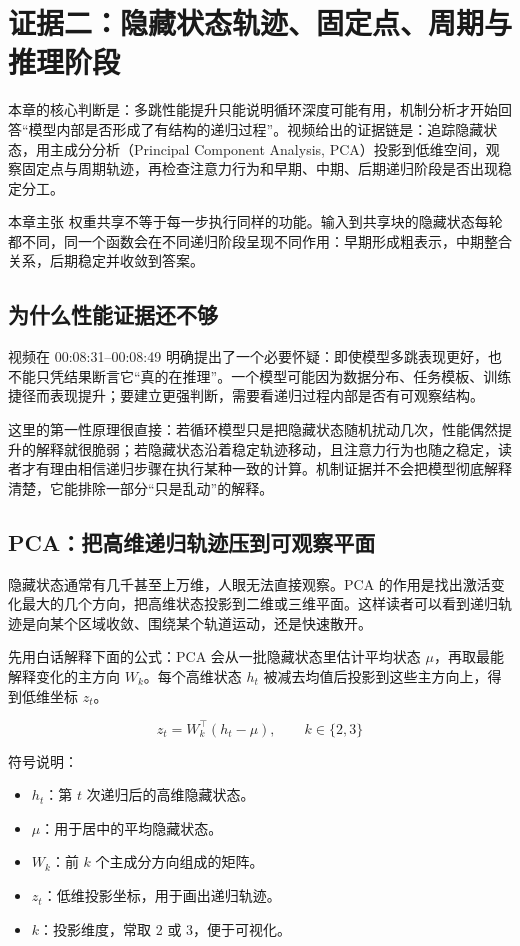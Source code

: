 \section{证据二：隐藏状态轨迹、固定点、周期与推理阶段}
\label{sec:mechanistic-analysis}

本章的核心判断是：多跳性能提升只能说明循环深度可能有用，机制分析才开始回答“模型内部是否形成了有结构的递归过程”。视频给出的证据链是：追踪隐藏状态，用主成分分析（Principal Component Analysis, PCA）投影到低维空间，观察固定点与周期轨迹，再检查注意力行为和早期、中期、后期递归阶段是否出现稳定分工。

\begin{importantbox}{本章主张}
权重共享不等于每一步执行同样的功能。输入到共享块的隐藏状态每轮都不同，同一个函数会在不同递归阶段呈现不同作用：早期形成粗表示，中期整合关系，后期稳定并收敛到答案。
\end{importantbox}

\subsection{为什么性能证据还不够}

视频在 00:08:31--00:08:49 明确提出了一个必要怀疑：即使模型多跳表现更好，也不能只凭结果断言它“真的在推理”。一个模型可能因为数据分布、任务模板、训练捷径而表现提升；要建立更强判断，需要看递归过程内部是否有可观察结构。

这里的第一性原理很直接：若循环模型只是把隐藏状态随机扰动几次，性能偶然提升的解释就很脆弱；若隐藏状态沿着稳定轨迹移动，且注意力行为也随之稳定，读者才有理由相信递归步骤在执行某种一致的计算。机制证据并不会把模型彻底解释清楚，它能排除一部分“只是乱动”的解释。

\subsection{PCA：把高维递归轨迹压到可观察平面}

隐藏状态通常有几千甚至上万维，人眼无法直接观察。PCA 的作用是找出激活变化最大的几个方向，把高维状态投影到二维或三维平面。这样读者可以看到递归轨迹是向某个区域收敛、围绕某个轨道运动，还是快速散开。

先用白话解释下面的公式：PCA 会从一批隐藏状态里估计平均状态 \(\mu\)，再取最能解释变化的主方向 \(W_k\)。每个高维状态 \(h_t\) 被减去均值后投影到这些主方向上，得到低维坐标 \(z_t\)。

\[
z_t=W_k^\top(h_t-\mu),\qquad k\in\{2,3\}
\]

符号说明：
\begin{itemize}
  \item \(h_t\)：第 \(t\) 次递归后的高维隐藏状态。
  \item \(\mu\)：用于居中的平均隐藏状态。
  \item \(W_k\)：前 \(k\) 个主成分方向组成的矩阵。
  \item \(z_t\)：低维投影坐标，用于画出递归轨迹。
  \item \(k\)：投影维度，常取 \(2\) 或 \(3\)，便于可视化。
\end{itemize}

